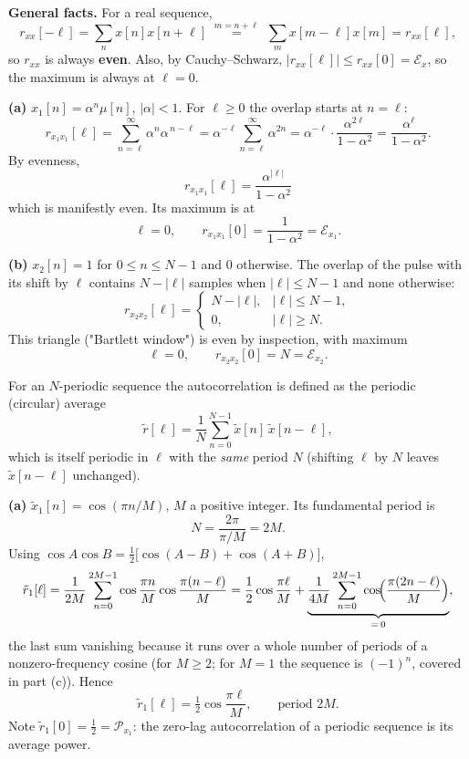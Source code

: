 
\textbf{General facts.} For a real sequence,
\[
r_{xx}[-\ell]=\sum_n x[n]x[n+\ell]\;\overset{m=n+\ell}{=}\;\sum_m x[m-\ell]x[m]=r_{xx}[\ell],
\]
so $r_{xx}$ is always \textbf{even}. Also, by Cauchy--Schwarz,
$|r_{xx}[\ell]|\le r_{xx}[0]=\mathcal{E}_x$, so the maximum is always at $\ell=0$.

\textbf{(a)} $x_1[n]=\alpha^{n}\mu[n]$, $|\alpha|<1$. For $\ell\ge0$ the overlap starts at
$n=\ell$:
\[
r_{x_1x_1}[\ell]=\sum_{n=\ell}^{\infty}\alpha^{n}\alpha^{\,n-\ell}
=\alpha^{-\ell}\sum_{n=\ell}^{\infty}\alpha^{2n}
=\alpha^{-\ell}\cdot\frac{\alpha^{2\ell}}{1-\alpha^{2}}
=\frac{\alpha^{\ell}}{1-\alpha^{2}} .
\]
By evenness,
\[
\boxed{\;r_{x_1x_1}[\ell]=\frac{\alpha^{|\ell|}}{1-\alpha^{2}}\;}
\]
which is manifestly even. Its maximum is at
\[
\boxed{\;\ell=0,\qquad r_{x_1x_1}[0]=\frac{1}{1-\alpha^{2}}=\mathcal{E}_{x_1}.\;}
\]

\textbf{(b)} $x_2[n]=1$ for $0\le n\le N-1$ and $0$ otherwise. The overlap of the pulse with
its shift by $\ell$ contains $N-|\ell|$ samples when $|\ell|\le N-1$ and none otherwise:
\[
\boxed{\;r_{x_2x_2}[\ell]=
\begin{cases}
N-|\ell|, & |\ell|\le N-1,\\
0, & |\ell|\ge N .
\end{cases}\;}
\]
This triangle ("Bartlett window") is even by inspection, with maximum
\[
\boxed{\;\ell=0,\qquad r_{x_2x_2}[0]=N=\mathcal{E}_{x_2}.\;}
\]


For an $N$-periodic sequence the autocorrelation is defined as the periodic (circular) average
\[
\tilde{r}[\ell]=\frac{1}{N}\sum_{n=0}^{N-1}\tilde{x}[n]\,\tilde{x}[n-\ell],
\]
which is itself periodic in $\ell$ with the \emph{same} period $N$ (shifting $\ell$ by $N$
leaves $\tilde x[n-\ell]$ unchanged).

\textbf{(a)} $\tilde{x}_1[n]=\cos(\pi n/M)$, $M$ a positive integer. Its fundamental period is
\[
N=\frac{2\pi}{\pi/M}=2M .
\]
Using $\cos A\cos B=\tfrac12\bigl[\cos(A-B)+\cos(A+B)\bigr]$,
\[
\tilde{r}_1[\ell]=\frac{1}{2M}\sum_{n=0}^{2M-1}\cos\frac{\pi n}{M}\cos\frac{\pi(n-\ell)}{M}
=\frac{1}{2}\cos\frac{\pi\ell}{M}
+\underbrace{\frac{1}{4M}\sum_{n=0}^{2M-1}\cos\!\Bigl(\frac{\pi(2n-\ell)}{M}\Bigr)}_{=\,0},
\]
the last sum vanishing because it runs over a whole number of periods of a nonzero-frequency
cosine (for $M\ge 2$; for $M=1$ the sequence is $(-1)^n$, covered in part (c)). Hence
\[
\boxed{\;\tilde{r}_1[\ell]=\tfrac12\cos\frac{\pi\ell}{M},\qquad\text{period }2M .\;}
\]
Note $\tilde r_1[0]=\tfrac12=\mathcal{P}_{x_1}$: the zero-lag autocorrelation of a periodic
sequence is its average power.

